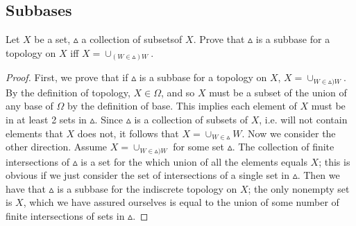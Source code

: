 \subsection{Subbases}
\begin{minorEx}%
Let $X$ be a set, $\vartriangle$ a collection of subsetsof $X$. Prove that $\vartriangle$ is a subbase for a topology on $X$ iff $X = \cup_{(W \in \vartriangle) W}$.
\end{minorEx}
\begin{proof}
First, we prove that if $\vartriangle$ is a subbase for a topology on $X$, $X = \cup_{W \in \vartriangle) W}$. By the definition of topology, $X \in \Omega$, and so $X$ must be a subset of the union of any base of $\Omega$ by the definition of base. This implies each element of $X$ must be in at least 2 sets in $\vartriangle$. Since $\vartriangle$ is a collection of subsets of $X$, i.e. will not contain elements that $X$ does not, it follows that $X = \cup_{W \in \vartriangle} W$.
Now we consider the other direction. Assume $X = \cup_{W \in \vartriangle) W}$ for some set $\vartriangle$. The collection of finite intersections of $\vartriangle$ is a set for the which union of all the elements equals $X$; this is obvious if we just consider the set of intersections of a single set in $\vartriangle$. Then we have that $\vartriangle$ is a subbase for the indiscrete topology on $X$; the only nonempty set is $X$, which we have assured ourselves is equal to the union of some number of finite intersections of sets in $\vartriangle$.
\end{proof}